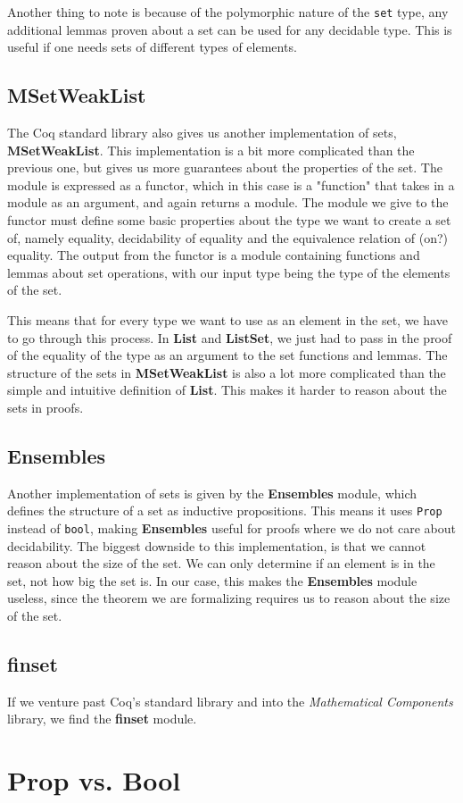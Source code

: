Another thing to note is because of the polymorphic nature of the \lstinline{set} type, any additional lemmas proven about a set can be
used for any decidable type. This is useful if one needs sets of different types of elements.

\subsection{MSetWeakList}

The Coq standard library also gives us another implementation of sets, \textbf{MSetWeakList}.
This implementation is a bit more complicated than the previous one,
but gives us more guarantees about the properties of the set.
The module is expressed as a functor, which in this case is a "function" that takes in a module as an argument, and again returns a module.
The module we give to the functor must define some basic properties about the type we want to create a set of,
namely equality, decidability of equality and the equivalence relation of (on?) equality.
The output from the functor is a module containing functions and lemmas about set operations,
with our input type being the type of the elements of the set.

This means that for every type we want to use as an element in the set, we have to go through this process.
In \textbf{List} and \textbf{ListSet}, we just had to pass in the proof of the equality of the type as an argument to the set functions and lemmas.
The structure of the sets in \textbf{MSetWeakList} is also a lot more complicated than the simple and intuitive definition of \textbf{List}.
This makes it harder to reason about the sets in proofs.

\subsection{Ensembles}

Another implementation of sets is given by the \textbf{Ensembles} module, which defines the structure of a set as inductive propositions.
This means it uses \lstinline[language=Coq]{Prop} instead of \lstinline[language=Coq]{bool},
making \textbf{Ensembles} useful for proofs where we do not care about decidability.
The biggest downside to this implementation, is that we cannot reason about the size of the set.
We can only determine if an element is in the set, not how big the set is.
In our case, this makes the \textbf{Ensembles} module useless, since the theorem we are formalizing requires us to reason about the
size of the set.

\subsection{finset}

If we venture past Coq's standard library and into the \textit{Mathematical Components} library, we find the \textbf{finset} module.


\section{Prop vs. Bool}
